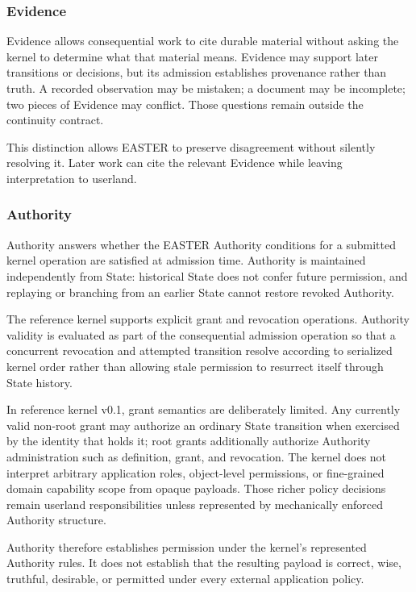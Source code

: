 \documentclass[11pt]{article}
\begin{document}
\subsubsection{Evidence}

Evidence allows consequential work to cite durable material without asking the kernel to determine what that material means. Evidence may support later transitions or decisions, but its admission establishes provenance rather than truth. A recorded observation may be mistaken; a document may be incomplete; two pieces of Evidence may conflict. Those questions remain outside the continuity contract.

This distinction allows EASTER to preserve disagreement without silently resolving it. Later work can cite the relevant Evidence while leaving interpretation to userland.

\subsubsection{Authority}

Authority answers whether the EASTER Authority conditions for a submitted kernel operation are satisfied at admission time. Authority is maintained independently from State: historical State does not confer future permission, and replaying or branching from an earlier State cannot restore revoked Authority.

The reference kernel supports explicit grant and revocation operations. Authority validity is evaluated as part of the consequential admission operation so that a concurrent revocation and attempted transition resolve according to serialized kernel order rather than allowing stale permission to resurrect itself through State history.

In reference kernel v0.1, grant semantics are deliberately limited. Any currently valid non-root grant may authorize an ordinary State transition when exercised by the identity that holds it; root grants additionally authorize Authority administration such as definition, grant, and revocation. The kernel does not interpret arbitrary application roles, object-level permissions, or fine-grained domain capability scope from opaque payloads. Those richer policy decisions remain userland responsibilities unless represented by mechanically enforced Authority structure.

Authority therefore establishes permission under the kernel's represented Authority rules. It does not establish that the resulting payload is correct, wise, truthful, desirable, or permitted under every external application policy.
\end{document}
